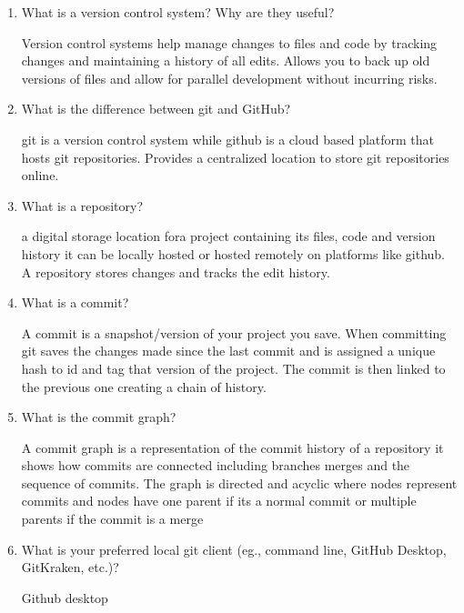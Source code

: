 \documentclass[10pt,twocolumn]{article}
\begin{document}
\begin{enumerate}
    \item What is a version control system? Why are they useful?

    \medskip
    Version control systems help manage changes to files and code by tracking changes and maintaining a history of all edits. Allows you to back up old versions of files and allow for parallel development without incurring risks. 
    \medskip
    
    \item What is the difference between git and GitHub?

    \medskip
    git is a version control system  while github is a cloud based platform that hosts git repositories. Provides a centralized location to store git repositories online.
    \medskip
    
    \item What is a repository?

    \medskip
    a digital storage location fora project containing its files, code and version history it can be locally hosted or hosted remotely on platforms like github. A repository stores changes and tracks the edit history.
    \medskip
    
    \item What is a commit?

    \medskip
    A commit is a snapshot/version of your project you save. When committing git saves the changes made since the last commit and is assigned a unique hash to id and tag that version of the project. The commit is then linked to the previous one creating a chain of history.
    \medskip
    
    \item What is the commit graph?

    \medskip
    A commit graph is a representation of the commit history of a repository it shows how commits are connected including branches merges and the sequence of commits. The graph is directed and acyclic where nodes represent commits and nodes have one parent if its a normal commit or multiple parents if the commit is a merge
    \medskip
    
    \item What is your preferred local git client (eg., command line, GitHub Desktop, GitKraken, etc.)?

    \medskip
    Github desktop
    \medskip
    
\end{enumerate}
\end{document}

